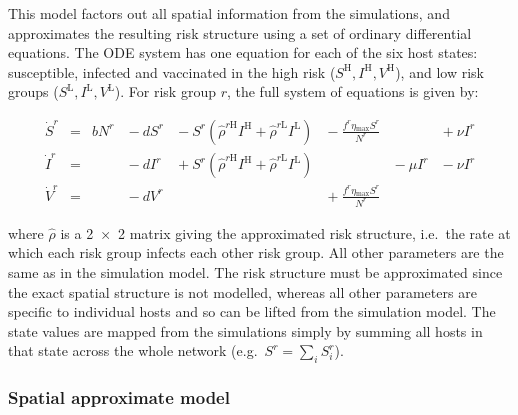 This model factors out all spatial information from the simulations, and approximates the resulting risk structure using a set of ordinary differential equations. The ODE system has one equation for each of the six host states: susceptible, infected and vaccinated in the high risk ($S^\mathrm{H}, I^\mathrm{H}, V^\mathrm{H}$), and low risk groups ($S^\mathrm{L}, I^\mathrm{L}, V^\mathrm{L}$). For risk group $r$, the full system of equations is given by:
\begin{linenomath*}
\begin{equation}
\begin{alignedat}{7}
    \dot{S}^r &={} &bN^r &{}-{} dS^r &{}-{} S^r\left(\hat{\rho}^{r\mathrm{H}}I^{\mathrm{H}} + \hat{\rho}^{r\mathrm{L}}I^{\mathrm{L}}\right) &{}-{} \frac{f^r\eta{}_\mathrm{max}S^r}{N^r} &&{}+{} \nu{}I^r \\
    \dot{I}^r &={}  &&{}-{} dI^r &{}+{} S^r\left(\hat{\rho}^{r\mathrm{H}}I^{\mathrm{H}} + \hat{\rho}^{r\mathrm{L}}I^{\mathrm{L}}\right)& &{}-{} \mu{}I^r &{}-{} \nu{}I^r \\
    \dot{V}^r &={}  &&{}-{} dV^r &&{}+{} \frac{f^r\eta{}_\mathrm{max}S^r}{N^r}&&
\end{alignedat}
\label{eq:risk_model}
\end{equation}
\end{linenomath*}
where $\hat{\rho}$ is a \num{2x2} matrix giving the approximated risk structure, i.e.\ the rate at which each risk group infects each other risk group. All other parameters are the same as in the simulation model. The risk structure must be approximated since the exact spatial structure is not modelled, whereas all other parameters are specific to individual hosts and so can be lifted from the simulation model. The state values are mapped from the simulations simply by summing all hosts in that state across the whole network (e.g.\ $S^r = \sum_{i}S^r_i$).

\subsubsection*{Spatial approximate model}

